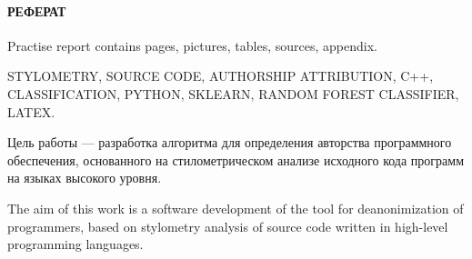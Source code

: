 \newpage
\paragraph{\hfill РЕФЕРАТ \hfill}
Practise report contains  pages,  pictures,  tables,
 sources,  appendix.

STYLOMETRY, SOURCE CODE, AUTHORSHIP ATTRIBUTION, C++, CLASSIFICATION, PYTHON, SKLEARN,
RANDOM FOREST CLASSIFIER, LATEX.

Цель работы --- разработка алгоритма для определения авторства программного обеспечения, 
основанного на стилометрическом анализе исходного кода программ на языках высокого уровня.

The aim of this work is a software development of the tool for deanonimization of programmers, 
based on stylometry analysis of source code written in high-level programming languages.  